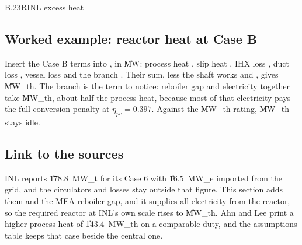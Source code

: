 \begin{eqcard}{B.23}{R}{INL excess heat}
\end{eqcard}

\subsection*{Worked example: reactor heat at Case B}
Insert the Case B terms into , in \U{MW}: process heat \vQprocxB, slip heat \vQrecB, IHX loss \vQihxB, duct loss \vQductB, vessel loss \vQvesB{} and the branch \vQbrB. Their sum, less the shaft works \vWsB{} and \vWpB, gives \vQRxB{} \U{MW_{th}}. The branch is the term to notice: reboiler gap and electricity together take \vQbrB{} \U{MW_{th}}, about half the process heat, because most of that electricity pays the full conversion penalty at $\eta_{pc}=0.397$. Against the \cQrated{} \U{MW_{th}} rating, \vSpareB{} \U{MW_{th}} stays idle.

\subsection*{Link to the sources}
INL reports \U{178.8\ MW_t} for its Case 6 with \U{16.5\ MW_e} imported from the grid, and the circulators and losses stay outside that figure. This section adds them and the MEA reboiler gap, and it supplies all electricity from the reactor, so the required reactor at INL's own scale rises to \vQRxA{} \U{MW_{th}}. Ahn and Lee print a higher process heat of \U{143.4\ MW_{th}} on a comparable duty, and the assumptions table keeps that case beside the central one.
